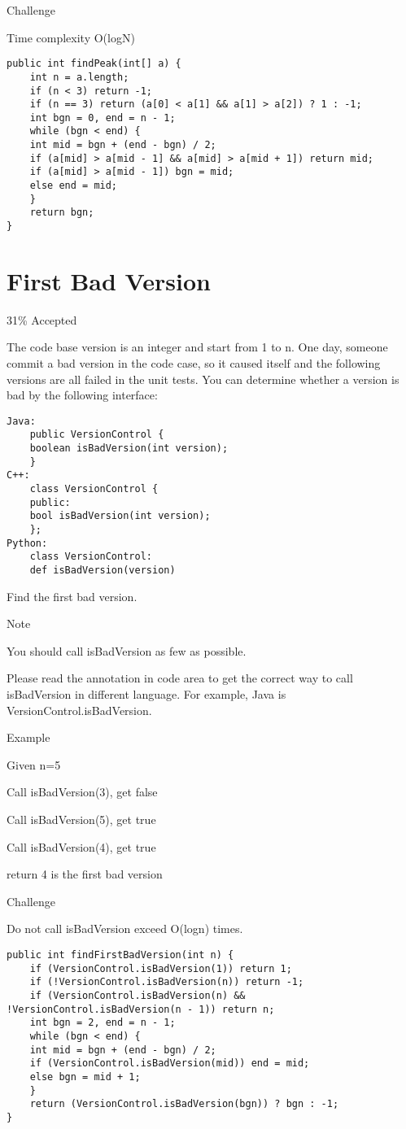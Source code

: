 \documentclass[12pt]{book}
\begin{document}
Challenge

Time complexity O(logN)
\lstset{language=java,label= ,caption= ,numbers=none}
\begin{lstlisting}
public int findPeak(int[] a) {
    int n = a.length;
    if (n < 3) return -1;
    if (n == 3) return (a[0] < a[1] && a[1] > a[2]) ? 1 : -1;
    int bgn = 0, end = n - 1;
    while (bgn < end) {
	int mid = bgn + (end - bgn) / 2;
	if (a[mid] > a[mid - 1] && a[mid] > a[mid + 1]) return mid;
	if (a[mid] > a[mid - 1]) bgn = mid;
	else end = mid;
    }
    return bgn;
}
\end{lstlisting}
\chapter{First Bad Version}
\label{sec-29}

31\% Accepted

The code base version is an integer and start from 1 to n. One day, someone commit a bad version in the code case, so it caused itself and the following versions are all failed in the unit tests.
You can determine whether a version is bad by the following interface: 
\lstset{language=java,label= ,caption= ,numbers=none}
\begin{lstlisting}
Java:
    public VersionControl {
	boolean isBadVersion(int version);
    }
C++:
    class VersionControl {
    public:
	bool isBadVersion(int version);
    };
Python:
    class VersionControl:
	def isBadVersion(version)
\end{lstlisting}

Find the first bad version.

Note

You should call isBadVersion as few as possible. 

Please read the annotation in code area to get the correct way to call isBadVersion in different language. For example, Java is VersionControl.isBadVersion.

Example

Given n=5

Call isBadVersion(3), get false

Call isBadVersion(5), get true

Call isBadVersion(4), get true

return 4 is the first bad version

Challenge

Do not call isBadVersion exceed O(logn) times.
\lstset{language=java,label= ,caption= ,numbers=none}
\begin{lstlisting}
public int findFirstBadVersion(int n) {
    if (VersionControl.isBadVersion(1)) return 1;
    if (!VersionControl.isBadVersion(n)) return -1;
    if (VersionControl.isBadVersion(n) && !VersionControl.isBadVersion(n - 1)) return n;
    int bgn = 2, end = n - 1;
    while (bgn < end) {
	int mid = bgn + (end - bgn) / 2;
	if (VersionControl.isBadVersion(mid)) end = mid;
	else bgn = mid + 1;
    }
    return (VersionControl.isBadVersion(bgn)) ? bgn : -1;
}
\end{lstlisting}
\end{document}
